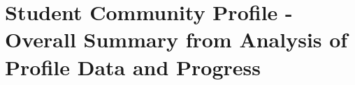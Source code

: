 \chapter{Student Community Profile - Overall Summary from Analysis of Profile Data and Progress}
\blindtext
